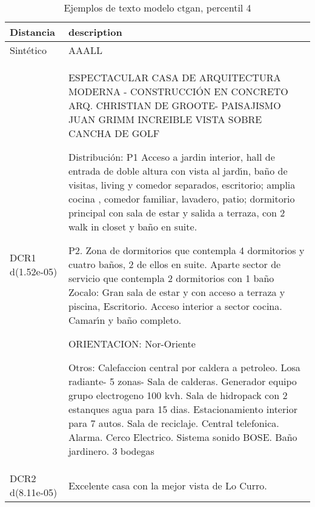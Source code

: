 \begin{table}[H]
\centering
\fontsize{10}{14}\selectfont
\caption{Ejemplos de texto modelo ctgan, percentil 4}
\label{table-example-economicos-a-1-ctgan-4p-text}
\begin{tabular}{|l|m{35em}|}
\hline
\rowcolor[gray]{0.8}
Distancia & description \\
\hline Sintético & AAALL \\
\hline DCR1 d(1.52e-05) & ESPECTACULAR CASA DE ARQUITECTURA MODERNA - 
CONSTRUCCI\'ON EN CONCRETO
ARQ. CHRISTIAN DE GROOTE- PAISAJISMO JUAN GRIMM
INCREIBLE VISTA SOBRE CANCHA DE GOLF

Distribuci\'on:
P1 Acceso a jardin interior, hall de entrada de doble altura con vista al jard{\'\i}n,  ba\~no de visitas, living y comedor  separados, escritorio; amplia cocina , comedor familiar, lavadero, patio; dormitorio principal con sala de  estar y salida a terraza, con  2 walk in closet y ba\~no en suite.

P2. Zona de dormitorios que contempla 4 dormitorios y cuatro ba\~nos, 2 de ellos en suite. Aparte sector de servicio que contempla 2 dormitorios con 1 ba\~no
Zocalo: Gran sala de estar  y con acceso a terraza y piscina, Escritorio.   Acceso interior a sector cocina. Camar{\'\i}n y ba\~no completo.

ORIENTACION: Nor-Oriente

Otros:
Calefaccion central por caldera a petroleo. Losa radiante- 5 zonas- Sala de calderas.  Generador equipo grupo electrogeno 100 kvh. Sala de hidropack con 2 estanques agua para 15 dias. Estacionamiento interior para 7 autos. Sala de reciclaje. Central telefonica. Alarma. Cerco Electrico. Sistema sonido BOSE.
Ba\~no jardinero. 3 bodegas \\
\hline DCR2 d(8.11e-05) & Excelente casa con la mejor vista de Lo Curro. \\
\hline
\end{tabular}
\end{table}
